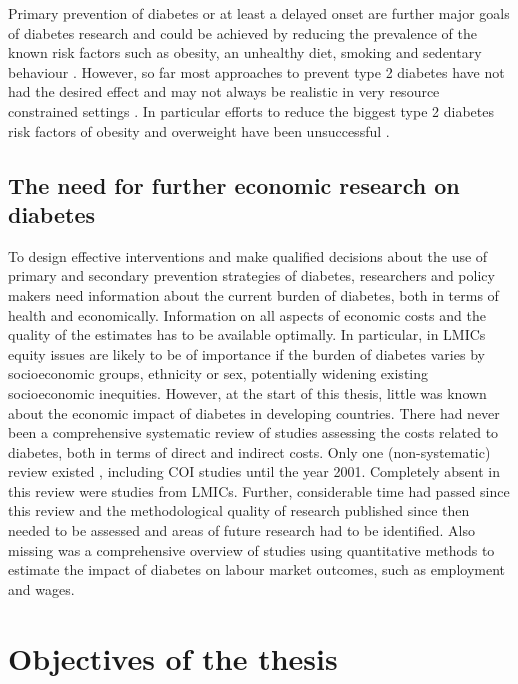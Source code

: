 Primary prevention of diabetes or at least a delayed onset are further major goals of diabetes research and could be achieved by reducing the prevalence of the known risk factors such as obesity, an unhealthy diet, smoking and sedentary behaviour \parencite{WorldHealthOrganization2016}. However, so far most approaches to prevent type 2 diabetes have not had the desired effect and may not always be realistic in very resource constrained settings \parencite{White2016}. In particular efforts to reduce the biggest type 2 diabetes risk factors of obesity and overweight have been unsuccessful \parencite{Roberto2015}.

\subsection{The need for further economic research on diabetes}

To design effective interventions and make qualified decisions about the use of primary and secondary prevention strategies of diabetes, researchers and policy makers need information about the current burden of diabetes, both in terms of health and economically. Information on all aspects of economic costs and the quality of the estimates has to be available optimally. In particular, in \acp{LMIC} equity issues are likely to be of importance if the burden of diabetes varies by socioeconomic groups, ethnicity or sex, potentially widening existing socioeconomic inequities. However, at the start of this thesis, little was known about the economic impact of diabetes in developing countries. There had never been a comprehensive systematic review of studies assessing the costs related to diabetes, both in terms of direct and indirect costs. Only one (non-systematic) review existed \parencite{Ettaro2004}, including \ac{COI} studies  until the year 2001. Completely absent in this review were studies from \acp{LMIC}. Further, considerable time had passed since this review and the methodological quality of research published since then needed to be assessed and areas of future research had to be identified. Also missing was a comprehensive overview of studies using quantitative methods to estimate the impact of diabetes on labour market outcomes, such as employment and wages.



\section{Objectives of the thesis}

